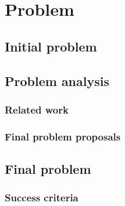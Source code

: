\chapter{Problem}\label{ch:problem}
\section{Initial problem}
\section{Problem analysis}
\subsection{Related work}
\subsection{Final problem proposals}
\section{Final problem}
\subsection{Success criteria}


